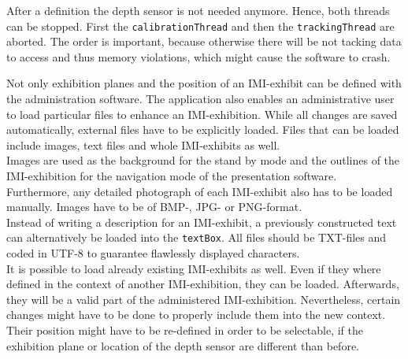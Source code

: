 After a definition the depth sensor is not needed anymore. Hence, both threads can be stopped. First the \texttt{calibrationThread} and then the \texttt{trackingThread} are aborted. The order is important, because otherwise there will be not tacking data to access and thus memory violations, which might cause the software to crash.

Not only exhibition planes and the position of an \ac{IMI}-exhibit can be defined with the administration software. The application also enables an administrative user to load particular files to enhance an \ac{IMI}-exhibition. While all changes are saved automatically, external files have to be explicitly loaded. Files that can be loaded include images, text files and whole \ac{IMI}-exhibits as well.
\\
Images are used as the background for the stand by mode and the outlines of the \ac{IMI}-exhibition for the navigation mode of the presentation software. Furthermore, any detailed photograph of each \ac{IMI}-exhibit also has to be loaded manually. Images have to be of BMP-, JPG- or PNG-format.
\\
Instead of writing a description for an \ac{IMI}-exhibit, a previously constructed text can alternatively be loaded into the \texttt{textBox}. All files should be TXT-files and coded in UTF-8 to guarantee flawlessly displayed characters.
\\
It is possible to load already existing \ac{IMI}-exhibits as well. Even if they where defined in the context of another \ac{IMI}-exhibition, they can be loaded. Afterwards, they will be a valid part of the administered \ac{IMI}-exhibition. Nevertheless, certain changes might have to be done to properly include them into the new context. Their position might have to be re-defined in order to be selectable, if the exhibition plane or location of the depth sensor are different than before.

